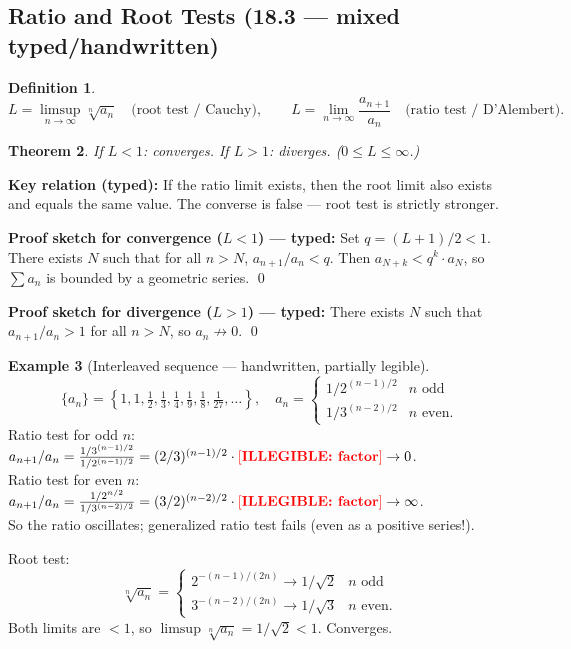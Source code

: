 \documentclass[12pt, a4paper]{article}
\newcommand{\illegible}[1][?]{\textcolor{red}{[\textbf{ILLEGIBLE: #1}]}}
\newtheorem{theorem}{Theorem}[section]
\theoremstyle{definition}
\newtheorem{definition}[theorem]{Definition}
\newtheorem{example}[theorem]{Example}
\theoremstyle{remark}
\begin{document}
\subsection{Ratio and Root Tests (18.3 --- mixed typed/handwritten)}

\begin{definition}
\[
  L = \limsup_{n\to\infty} \sqrt[n]{a_n} \quad \text{(root test / Cauchy)}, \qquad
  L = \lim_{n\to\infty} \frac{a_{n+1}}{a_n} \quad \text{(ratio test / D'Alembert)}.
\]
\end{definition}

\begin{theorem}
If $L < 1$: converges. If $L > 1$: diverges. ($0 \leq L \leq \infty$.)
\end{theorem}

\textbf{Key relation (typed):} If the ratio limit exists, then the root limit also exists and equals the same value. The converse is false --- root test is strictly stronger.

\textbf{Proof sketch for convergence ($L < 1$) --- typed:}
Set $q = (L+1)/2 < 1$. There exists $N$ such that for all $n > N$, $a_{n+1}/a_n < q$.
Then $a_{N+k} < q^k \cdot a_N$, so $\sum a_n$ is bounded by a geometric series. \qed

\textbf{Proof sketch for divergence ($L > 1$) --- typed:}
There exists $N$ such that $a_{n+1}/a_n > 1$ for all $n > N$, so $a_n \not\to 0$. \qed

\begin{example}[Interleaved sequence --- handwritten, partially legible]
\[
  \{a_n\} = \left\{1, 1, \tfrac{1}{2}, \tfrac{1}{3}, \tfrac{1}{4}, \tfrac{1}{9}, \tfrac{1}{8}, \tfrac{1}{27}, \ldots\right\},
  \quad
  a_n = \begin{cases} 1/2^{(n-1)/2} & n \text{ odd} \\ 1/3^{(n-2)/2} & n \text{ even.} \end{cases}
\]
Ratio test for odd $n$: $a_{n+1}/a_n = \frac{1/3^{(n-1)/2}}{1/2^{(n-1)/2}} = (2/3)^{(n-1)/2} \cdot \illegible[factor] \to 0$.\\
Ratio test for even $n$: $a_{n+1}/a_n = \frac{1/2^{n/2}}{1/3^{(n-2)/2}} = (3/2)^{(n-2)/2} \cdot \illegible[factor] \to \infty$.\\
So the ratio oscillates; generalized ratio test fails (even as a positive series!).

Root test:
\[
  \sqrt[n]{a_n} = \begin{cases} 2^{-(n-1)/(2n)} \to 1/\sqrt{2} & n \text{ odd} \\ 3^{-(n-2)/(2n)} \to 1/\sqrt{3} & n \text{ even.} \end{cases}
\]
Both limits are $< 1$, so $\limsup \sqrt[n]{a_n} = 1/\sqrt{2} < 1$. Converges.
\end{example}
\end{document}
